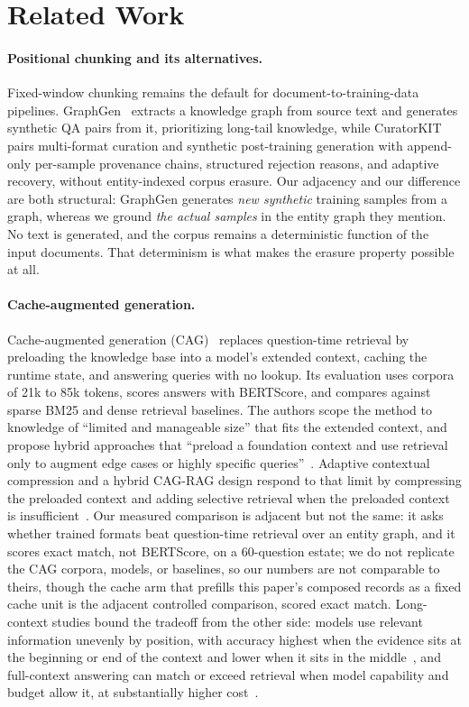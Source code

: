 \documentclass{article}
\begin{document}
\section{Related Work}
\label{sec:related}

\paragraph{Positional chunking and its alternatives.}
Fixed-window chunking remains the default for document-to-training-data pipelines. GraphGen~\cite{chen2025graphgen} extracts a knowledge graph from source text and generates synthetic QA pairs from it, prioritizing long-tail knowledge, while CuratorKIT~\cite{bhattacharjee2026curatorkit} pairs multi-format curation and synthetic post-training generation with append-only per-sample provenance chains, structured rejection reasons, and adaptive recovery, without entity-indexed corpus erasure. Our adjacency and our difference are both structural: GraphGen generates \emph{new synthetic} training samples from a graph, whereas we ground \emph{the actual samples} in the entity graph they mention. No text is generated, and the corpus remains a deterministic function of the input documents. That determinism is what makes the erasure property possible at all.

\paragraph{Cache-augmented generation.}
Cache-augmented generation (CAG)~\cite{chan2024cag} replaces question-time retrieval by preloading the knowledge base into a model's extended context, caching the runtime state, and answering queries with no lookup. Its evaluation uses corpora of 21k to 85k tokens, scores answers with BERTScore, and compares against sparse BM25 and dense retrieval baselines. The authors scope the method to knowledge of ``limited and manageable size'' that fits the extended context, and propose hybrid approaches that ``preload a foundation context and use retrieval only to augment edge cases or highly specific queries''~\cite{chan2024cag}. Adaptive contextual compression and a hybrid CAG-RAG design respond to that limit by compressing the preloaded context and adding selective retrieval when the preloaded context is insufficient~\cite{agrawal2025acc}. Our measured comparison is adjacent but not the same: it asks whether trained formats beat question-time retrieval over an entity graph, and it scores exact match, not BERTScore, on a 60-question estate; we do not replicate the CAG corpora, models, or baselines, so our numbers are not comparable to theirs, though the cache arm that prefills this paper's composed records as a fixed cache unit is the adjacent controlled comparison, scored exact match. Long-context studies bound the tradeoff from the other side: models use relevant information unevenly by position, with accuracy highest when the evidence sits at the beginning or end of the context and lower when it sits in the middle~\cite{liu2023lost}, and full-context answering can match or exceed retrieval when model capability and budget allow it, at substantially higher cost~\cite{li2024raglc}.
\end{document}
